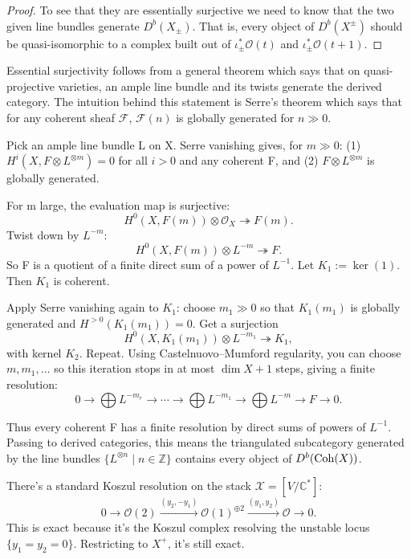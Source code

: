 \documentclass[12pt]{article}
\begin{document}
\begin{proof}
To see that they are essentially surjective we need to know that the two given line bundles generate $D^b(X_\pm)$. That is, every object of $D^b(X^\pm)$ should be quasi-isomorphic to a complex built out of $\iota_\pm^*\mathcal{O}(t)$ and $\iota_\pm^*\mathcal{O}(t+1)$.

\end{proof}

\begin{remark}
  Essential surjectivity follows from a general theorem which says that on quasi-projective varieties, an ample line bundle and its twists generate the derived category. The intuition behind this statement is Serre's theorem which says that for any coherent sheaf $\mathcal{F}$, $\mathcal{F}(n)$ is globally generated for $n\gg 0$. 

  Pick an ample line bundle L on X. Serre vanishing gives, for $m\gg0$: (1) $H^i(X, F\otimes L^{\otimes m})=0$ for all $i>0$ and any coherent F, and (2) $F\otimes L^{\otimes m}$ is globally generated.

  For m large, the evaluation map is surjective:
  \[
  H^0(X, F(m))\otimes \mathcal O_X \twoheadrightarrow F(m).
  \]
  Twist down by $L^{-m}$:
  \[
  H^0(X, F(m))\otimes L^{-m} \twoheadrightarrow F.
  \]
  So F is a quotient of a finite direct sum of a power of $L^{-1}$. Let $K_1:=\ker(1)$. Then $K_1$ is coherent.

  Apply Serre vanishing again to $K_1$: choose $m_1\gg0$ so that $K_1(m_1)$ is globally generated and $H^{>0}(K_1(m_1))=0$. Get a surjection
  \[
  H^0(X, K_1(m_1))\otimes L^{-m_1}\twoheadrightarrow K_1,
  \]
  with kernel $K_2$. Repeat. Using Castelnuovo–Mumford regularity, you can choose $m, m_1,\dots$ so this iteration stops in at most $\dim X+1$ steps, giving a finite resolution:
  \[
  0\to \bigoplus L^{-m_r} \to \cdots \to \bigoplus L^{-m_1}\to \bigoplus L^{-m}\to F\to 0.
  \]

  Thus every coherent F has a finite resolution by direct sums of powers of $L^{-1}$. Passing to derived categories, this means the triangulated subcategory generated by the line bundles $\{L^{\otimes n}\mid n\in\mathbb Z\}$ contains every object of $D^b(\operatorname{Coh}(X))$.
\end{remark}

There's a standard Koszul resolution on the stack $\mathcal{X}=[V/\mathbb{C}^*]$:
\[
  0 \to \mathcal{O}(2) \xrightarrow{(y_2,-y_1)} \mathcal{O}(1)^{\oplus 2} \xrightarrow{(y_1,y_2)} \mathcal{O} \to 0.
\]
This is exact because it's the Koszul complex resolving the unstable locus $\{y_1=y_2=0\}$. Restricting to $X^+$, it's still exact.
\end{document}
